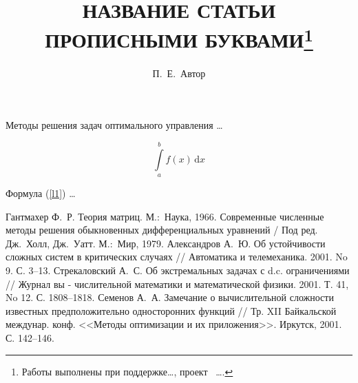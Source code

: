 \documentclass[12pt]{llncs}
\begin{document}
\title{НАЗВАНИЕ СТАТЬИ ПРОПИСНЫМИ БУКВАМИ\thanks{Работы выполнены при поддержке\ldots, проект \textnumero~\ldots.}}

\author{П.~Е.~Автор %
}


\maketitle


Методы решения задач оптимального управления  \ldots

\begin{equation}
 \int\limits_a^b f(x)\,\mathrm{d} x  \label{l1}
\end{equation}

Формула (\ref{l1}) \ldots

\begin{thebibliography}{9}
 Гантмахер Ф.~Р. Теория матриц.  М.:~Наука, 1966.
 Современные численные методы решения обыкновенных дифференциальных уравнений / Под ред.  Дж.~Холл, Дж.~Уатт.  М.:~Мир, 1979.
 Александров А.~Ю. Об устойчивости сложных систем в критических случаях // Автоматика и телемеханика. 2001.  No 9.  С. 3--13.
 Стрекаловский А.~С.  Об экстремальных задачах с d.c. ограничениями // Журнал вы - числительной математики и математической физики.  2001.  Т. 41, No 12.  С. 1808--1818.
  Семенов А.~А.  Замечание о вычислительной сложности известных предположительно односторонних функций // Тр. XII Байкальской междунар.  конф. <<Методы оптимизации и их приложения>>.  Иркутск, 2001.  С. 142--146.
\end{thebibliography}
\end{document}
